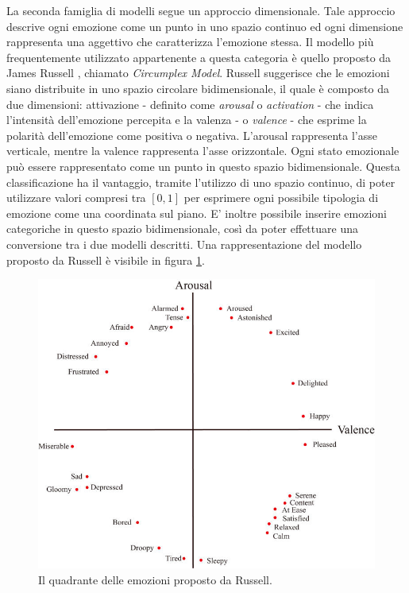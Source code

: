 \documentclass[11pt]{report}
\begin{document}

\newpage

La seconda famiglia di modelli segue un approccio dimensionale. Tale approccio descrive ogni emozione come un punto in uno spazio continuo ed ogni dimensione rappresenta una aggettivo che caratterizza l'emozione stessa. Il modello più frequentemente utilizzato appartenente a questa categoria è quello proposto da James Russell \cite{Russel}, chiamato \textit{Circumplex Model}. Russell suggerisce che le emozioni siano distribuite in uno spazio circolare bidimensionale, il quale è composto da due dimensioni: attivazione - definito come \textit{arousal} o \textit{activation} - che indica l'intensità dell'emozione percepita e la valenza - o \textit{valence} - che esprime la polarità dell'emozione come positiva o negativa. L'arousal rappresenta l'asse verticale, mentre la valence rappresenta l'asse orizzontale. Ogni stato emozionale può essere rappresentato come un punto in questo spazio bidimensionale. Questa classificazione ha il vantaggio, tramite l'utilizzo di uno spazio continuo, di poter utilizzare valori compresi tra $[0,1]$ per esprimere ogni possibile tipologia di emozione come una coordinata sul piano. E' inoltre possibile inserire emozioni categoriche in questo spazio bidimensionale, così da poter effettuare una conversione tra i due modelli descritti. Una rappresentazione del modello proposto da Russell è visibile in figura \ref{fig:russell}.

\newpage

\begin{figure}[h]
    \centering
    \includegraphics[scale = 0.38]{img/Russells-circumplex.jpg}
    \caption{Il quadrante delle emozioni proposto da Russell. \cite{seo2019automatic}}
    \label{fig:russell}
\end{figure}
\end{document}
